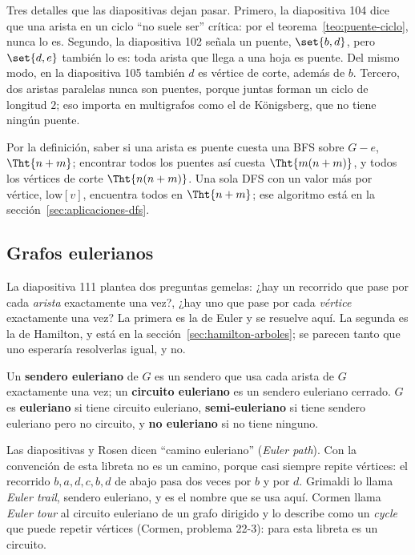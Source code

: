 \documentclass[11pt,letterpaper]{article}
\begin{document}
\begin{ojo}
  Tres detalles que las diapositivas dejan pasar. Primero, la
  diapositiva 104 dice que una arista en un ciclo ``no suele ser''
  crítica: por el teorema~\ref{teo:puente-ciclo}, nunca lo es. Segundo,
  la diapositiva 102 señala un puente, $\set{b, d}$, pero
  $\set{d, e}$ también lo es: toda arista que llega a una hoja es
  puente. Del mismo modo, en la diapositiva 105 también $d$ es vértice
  de corte, además de $b$. Tercero, dos aristas paralelas nunca son
  puentes, porque juntas forman un ciclo de longitud $2$; eso importa
  en multigrafos como el de Königsberg, que no tiene ningún puente.
\end{ojo}

Por la definición, saber si una arista es puente cuesta una BFS sobre
$G - e$, $\Tht{n + m}$; encontrar todos los puentes así cuesta
$\Tht{m(n + m)}$, y todos los vértices de corte $\Tht{n(n + m)}$. Una
sola DFS con un valor más por vértice, $\text{low}[v]$, encuentra
todos en $\Tht{n + m}$; ese algoritmo está en la
sección~\ref{sec:aplicaciones-dfs}.


\subsection*{Grafos eulerianos}

La diapositiva 111 plantea dos preguntas gemelas: ¿hay un recorrido
que pase por cada \emph{arista} exactamente una vez?, ¿hay uno que pase
por cada \emph{vértice} exactamente una vez? La primera es la de
Euler y se resuelve aquí. La segunda es la de Hamilton, y está en la
sección~\ref{sec:hamilton-arboles}; se parecen tanto que uno esperaría
resolverlas igual, y no.

\begin{definicion}
  \label{def:euleriano}
  Un \textbf{sendero euleriano} de $G$ es un sendero que usa cada
  arista de $G$ exactamente una vez; un \textbf{circuito euleriano} es
  un sendero euleriano cerrado. $G$ es \textbf{euleriano} si tiene
  circuito euleriano, \textbf{semi-euleriano} si tiene sendero
  euleriano pero no circuito, y \textbf{no euleriano} si no tiene
  ninguno.
\end{definicion}

\begin{ojo}
  Las diapositivas y Rosen dicen ``camino euleriano'' (\textit{Euler
  path}). Con la convención de esta libreta no es un camino, porque casi
  siempre repite vértices: el recorrido $b, a, d, c, b, d$ de abajo
  pasa dos veces por $b$ y por $d$. Grimaldi lo llama \textit{Euler
  trail}, sendero euleriano, y es el nombre que se usa aquí. Cormen
  llama \textit{Euler tour} al circuito euleriano de un grafo dirigido
  y lo describe como un \textit{cycle} que puede repetir vértices
  (Cormen, problema 22-3): para esta libreta es un circuito.
\end{ojo}
\end{document}
